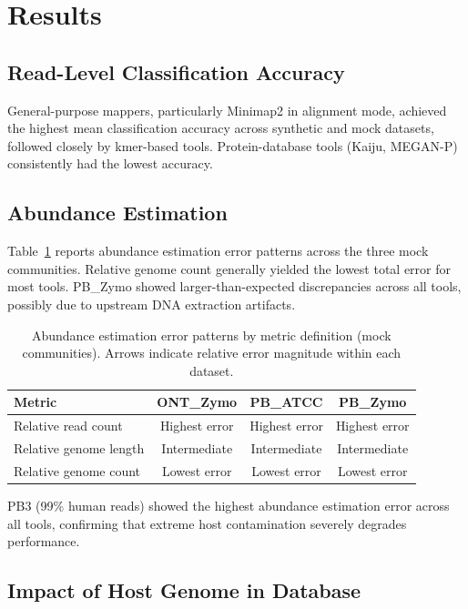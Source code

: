 \documentclass[11pt]{article}
\begin{document}
\section{Results}

\subsection{Read-Level Classification Accuracy}

General-purpose mappers, particularly Minimap2 in alignment mode, achieved the highest mean classification accuracy across synthetic and mock datasets, followed closely by kmer-based tools.  Protein-database tools (Kaiju, MEGAN-P) consistently had the lowest accuracy.

\subsection{Abundance Estimation}

Table~\ref{tab:abundance} reports abundance estimation error patterns across the three mock communities.  Relative genome count generally yielded the lowest total error for most tools.  PB\_Zymo showed larger-than-expected discrepancies across all tools, possibly due to upstream DNA extraction artifacts.

\begin{table}[ht]
\centering
\caption{Abundance estimation error patterns by metric definition (mock communities). Arrows indicate relative error magnitude within each dataset.}
\label{tab:abundance}
\begin{tabular}{@{}lccc@{}}
\toprule
Metric & ONT\_Zymo & PB\_ATCC & PB\_Zymo \\
\midrule
Relative read count & Highest error & Highest error & Highest error \\
Relative genome length & Intermediate & Intermediate & Intermediate \\
Relative genome count & Lowest error & Lowest error & Lowest error \\
\bottomrule
\end{tabular}
\end{table}

PB3 (99\% human reads) showed the highest abundance estimation error across all tools, confirming that extreme host contamination severely degrades performance.

\subsection{Impact of Host Genome in Database}
\end{document}

